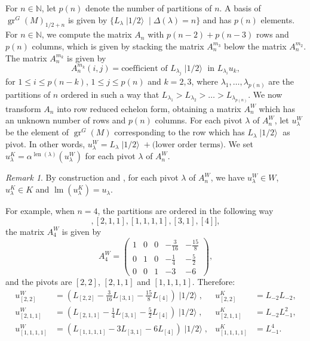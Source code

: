 \documentclass[a4paper, 12pt, reqno]{amsart}
\theoremstyle{remark}
\newtheorem{remark}[theorem]{Remark}
\DeclareMathOperator{\gr}{gr}
\DeclareMathOperator{\lm}{lm}
\DeclareMathOperator{\len}{len}
\DeclareMathOperator{\vachalf}{|1/2\rangle}
\begin{document}
For $n \in \mathbb{N}$, let $p(n)$ denote the number of partitions of $n$.
A basis of $\gr^G(M)_{1/2 + n}$ is given by $\{L_{\lambda}\vachalf \mid \Delta(\lambda) = n\}$ and has $p(n)$ elements.
For $n \in \mathbb{N}$, we compute the matrix $A_n$ with $p(n - 2) + p(n - 3)$ rows and $p(n)$ columns, which is given by stacking the matrix $A^{m_3}_n$ below the matrix $A^{m_2}_n$.
The matrix $A^{m_k}_n$ is given by
\begin{equation*}
  A^{m_k}_n(i, j) = \text{coefficient of $L_{\lambda_j}\vachalf$ in $L_{\lambda_i}u_k$},
\end{equation*}
for $1 \le i \le p(n - k)$, $1 \le j \le p(n)$ and $k = 2, 3$, where $\lambda_1, \dots, \lambda_{p(n)}$ are the partitions of $n$ ordered in such a way that $L_{\lambda_1} > L_{\lambda_2} > \dots > L_{\lambda_{p(n)}}$.
We now transform $A_n$ into row reduced echelon form, obtaining a matrix $A^W_n$ which has an unknown number of rows and $p(n)$ columns.
For each pivot $\lambda$ of $A^W_n$, let $u^W_{\lambda}$ be the element of $\gr^G(M)$ corresponding to the row which has $L_{\lambda}\vachalf$ as pivot.
In other words, $u^W_{\lambda} = L_{\lambda}\vachalf + \text{(lower order terms)}$.
We set $u^K_{\lambda} = \alpha^{\len(\lambda)}(u^W_{\lambda})$ for each pivot $\lambda$ of $A^W_n$.

\begin{remark}
  \label{rmk:4}
  By construction and , for each pivot $\lambda$ of $A^W_n$, we have $u^W_{\lambda} \in W$, $u^K_{\lambda} \in K$ and $\lm(u^K_{\lambda}) = u_{\lambda}$.
\end{remark}

For example, when $n = 4$, the partitions are ordered in the following way
\begin{equation*}
  [[2, 2], [2, 1, 1], [1, 1, 1, 1], [3, 1], [4]],
\end{equation*}
the matrix $A^W_4$ is given by
\begin{equation*}
  A^W_4=
  \begin{pmatrix}
    1 & 0 & 0 & -\frac{3}{16} & -\frac{15}{8} \\
    0 & 1 & 0 & -\frac{1}{4} & -\frac{5}{2} \\
    0 & 0 & 1 & -3 & -6
  \end{pmatrix},
\end{equation*}
and the pivots are $[2, 2]$, $[2, 1, 1]$ and $[1, 1, 1, 1]$.
Therefore:
\begin{align*}
  u^W_{[2, 2]} &= (L_{[2, 2]} - \tfrac{3}{16}L_{[3, 1]} - \tfrac{15}{8}L_{[4]})\vachalf, &u^K_{[2, 2]} &= L_{-2}L_{-2}, \\
  u^W_{[2, 1, 1]} &= (L_{[2, 1, 1]} - \tfrac{1}{4}L_{[3, 1]} - \tfrac{5}{2}L_{[4]})\vachalf, &u^K_{[2, 1, 1]} &= L_{-2}L_{-1}^2, \\
  u^W_{[1, 1, 1, 1]} &= (L_{[1, 1, 1, 1]} - 3L_{[3, 1]} - 6L_{[4]})\vachalf, &u^K_{[1, 1, 1, 1]} &= L_{-1}^4.
\end{align*}
\end{document}
